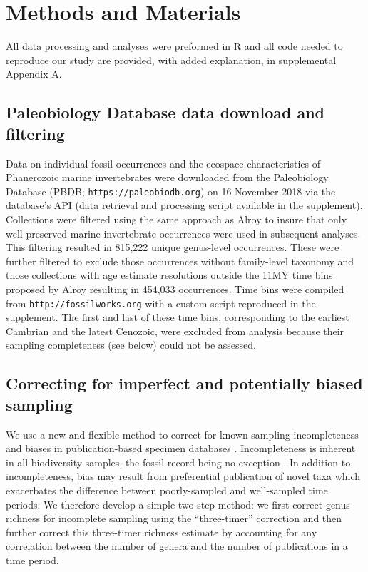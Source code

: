\documentclass[12pt]{article}
\let\citep=\cite
\begin{document}
\section{Methods and Materials}

All data processing and analyses were preformed in R \citep{rcite} and
all code needed to reproduce our study are provided, with added
explanation, in supplemental Appendix A.

\subsection{Paleobiology Database data download and filtering}
Data on individual fossil occurrences and the ecospace characteristics
of Phanerozoic marine invertebrates were downloaded from the
Paleobiology Database (PBDB; \newline\texttt{https://paleobiodb.org}) on 16
November 2018 via the database's API (data retrieval and processing
script available in the supplement). Collections were filtered using
the same approach as Alroy \citep{alroy08} to insure that only well
preserved marine invertebrate occurrences were used in subsequent
analyses. This filtering resulted in 815,222 unique genus-level
occurrences. These were further filtered to exclude those occurrences
without family-level taxonomy and those collections with age estimate
resolutions outside the 11MY time bins proposed by Alroy
\citep{alroy08} resulting in 454,033 occurrences. Time bins were
compiled from {\tt http://fossilworks.org} with a custom script
reproduced in the supplement. The first and last of these time bins,
corresponding to the earliest Cambrian and the latest Cenozoic, were
excluded from analysis because their sampling completeness (see below)
could not be assessed.


\subsection{Correcting for imperfect and potentially biased sampling}
\label{sec:3TP}
We use a new and flexible method to correct for known sampling
incompleteness and biases in publication-based specimen databases
\citep{alroy08, alroy2010}. Incompleteness is inherent in all
biodiversity samples, the fossil record being no exception
\citep{miller1996, foote2016, starrfelt2016, close2018}.  In addition
to incompleteness, bias may result from preferential publication of
novel taxa \citep{alroy2010} which exacerbates the difference between
poorly-sampled and well-sampled time periods. We therefore develop a
simple two-step method: we first correct genus richness for incomplete
sampling using the ``three-timer'' correction \citep{alroy08} and then
further correct this three-timer richness estimate by accounting for
any correlation between the number of genera and the number of
publications in a time period.
\end{document}
